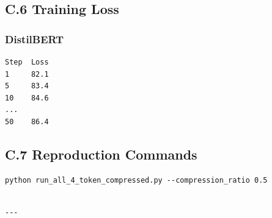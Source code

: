 \subsection{C.6 Training Loss}

\subsubsection{DistilBERT}
\begin{lstlisting}
Step  Loss
1     82.1
5     83.4
10    84.6
...
50    86.4
\end{lstlisting}

\subsection{C.7 Reproduction Commands}

\begin{lstlisting}
python run_all_4_token_compressed.py --compression_ratio 0.5
\end{lstlisting}
\begin{lstlisting}

---
\end{lstlisting}